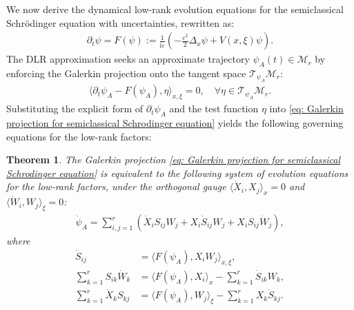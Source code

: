 \documentclass[preprint,11pt]{elsarticle}
\newtheorem{theorem}{Theorem}[section]
\begin{document}
We now derive the dynamical low-rank evolution equations for the semiclassical Schrödinger equation with uncertainties, rewritten as:
\begin{align*}
    \partial_t \psi = F(\psi) := \frac{1}{\mathrm{i}\varepsilon} \left( -\frac{\varepsilon^2}{2} \Delta_x \psi + V(x,\xi) \psi \right).
\end{align*}
The DLR approximation seeks an approximate trajectory $\psi_A(t) \in \mathcal{M}_r$ by enforcing the Galerkin projection onto the tangent space $\mathcal{T}_{\psi_A}\mathcal{M}_r$:
\begin{align}\label{eq: Galerkin projection for semiclassical Schrodinger equation}
    \langle \partial_t \psi_A - F(\psi_A), \eta \rangle_{x,\xi} = 0, \quad \forall \eta \in \mathcal{T}_{\psi_A}\mathcal{M}_r.
\end{align}
Substituting the explicit form of $\partial_t \psi_A$ and the test function $\eta$ into \eqref{eq: Galerkin projection for semiclassical Schrodinger equation} yields the following governing equations for the low-rank factors:
\begin{theorem}
    The Galerkin projection \eqref{eq: Galerkin projection for semiclassical Schrodinger equation} is equivalent to the following system of evolution equations for the low-rank factors, under the orthogonal gauge $\langle \dot{X}_i, X_j \rangle_x = 0$ and $\langle \dot{W}_i, W_j \rangle_\xi = 0$:
    \begin{align}\label{eq: total_velocity}
        \dot{\psi}_A = \sum_{i,j=1}^{r} \left( \dot{X}_i S_{ij} W_j + X_i \dot{S}_{ij} W_j + X_i S_{ij} \dot{W}_j \right),
    \end{align}
    where
    \begin{align}
        \dot{S}_{ij} &= \langle F(\psi_A), X_i W_j \rangle_{x,\xi}, \label{eq: dot_S} \\
        \sum_{k=1}^{r} S_{ik} \dot{W}_k &= \langle F(\psi_A), X_i \rangle_{x} - \sum_{k=1}^{r} \dot{S}_{ik} W_k, \label{eq: dot_W} \\
        \sum_{k=1}^{r} \dot{X}_k S_{kj} &= \langle F(\psi_A), W_j \rangle_{\xi} - \sum_{k=1}^{r} X_k \dot{S}_{kj}. \label{eq: dot_X}
    \end{align}
\end{theorem}
\end{document}
